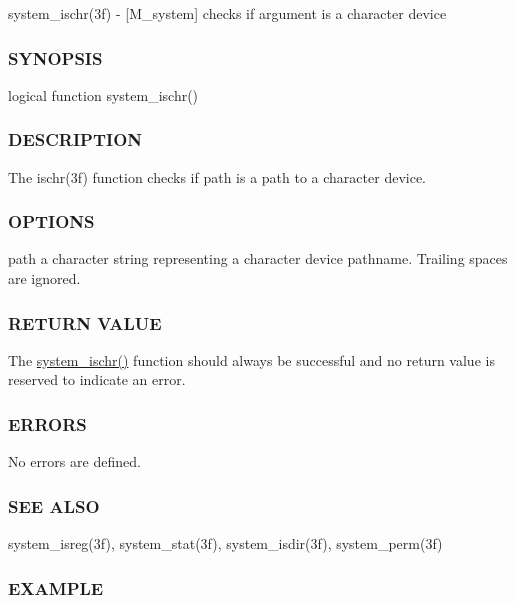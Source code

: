 system\+\_\+ischr(3f) -\/ \mbox{[}M\+\_\+system\mbox{]} checks if argument is a character device 

\subsubsection*{S\+Y\+N\+O\+P\+S\+IS}

\begin{DoxyVerb}logical function system_ischr()
\end{DoxyVerb}


\subsubsection*{D\+E\+S\+C\+R\+I\+P\+T\+I\+ON}

The ischr(3f) function checks if path is a path to a character device.

\subsubsection*{O\+P\+T\+I\+O\+NS}

path a character string representing a character device pathname. Trailing spaces are ignored.

\subsubsection*{R\+E\+T\+U\+RN V\+A\+L\+UE}

The \hyperlink{namespacem__system_a12a948fa4aacda084a538ae3a5ae3cc6}{system\+\_\+ischr()} function should always be successful and no return value is reserved to indicate an error.

\subsubsection*{E\+R\+R\+O\+RS}

No errors are defined.

\subsubsection*{S\+EE A\+L\+SO}

system\+\_\+isreg(3f), system\+\_\+stat(3f), system\+\_\+isdir(3f), system\+\_\+perm(3f)

\subsubsection*{E\+X\+A\+M\+P\+LE}


